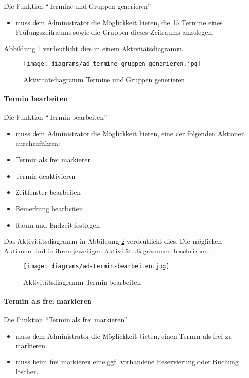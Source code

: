 Die Funktion ``Termine und Gruppen generieren''
\begin{itemize}
  \item muss dem Administrator die Möglichkeit bieten, die 15 Termine eines Prüfungszeitraums sowie die Gruppen dieses Zeitraums anzulegen.
\end{itemize}

Abbildung \ref{fig:ad-termine-gruppen-generieren} verdeutlicht dies in einem Aktivitätsdiagramm.

\begin{figure}
  \centering
  \texttt{[image: diagrams/ad-termine-gruppen-generieren.jpg]}
  \caption{Aktivitätsdiagramm Termine und Gruppen generieren}
  \label{fig:ad-termine-gruppen-generieren}
\end{figure}

\paragraph{Termin bearbeiten}

Die Funktion ``Termin bearbeiten''
\begin{itemize}
  \item muss dem Administrator die Möglichkeit bieten, eine der folgenden Aktionen durchzuführen:
  \item Termin als frei markieren
  \item Termin deaktivieren
  \item Zeitfenster bearbeiten
  \item Bemerkung bearbeiten
  \item Raum und Endzeit festlegen
\end{itemize}

Das Aktivitätsdiagramm in Abbildung \ref{fig:ad-termin-bearbeiten} verdeutlicht dies. Die möglichen Aktionen
sind in ihren jeweiligen Aktivitätsdiagrammen beschrieben.

\begin{figure}
  \centering
  \texttt{[image: diagrams/ad-termin-bearbeiten.jpg]}
  \caption{Aktivitätsdiagramm Termin bearbeiten}
  \label{fig:ad-termin-bearbeiten}
\end{figure}

\paragraph{Termin als frei
markieren}

Die Funktion ``Termin als frei markieren''
\begin{itemize}
  \item muss dem Administrator die Möglichkeit bieten, einen Termin als frei zu markieren.
  \item muss beim frei markieren eine ggf. vorhandene Reservierung oder Buchung löschen.
\end{itemize}

